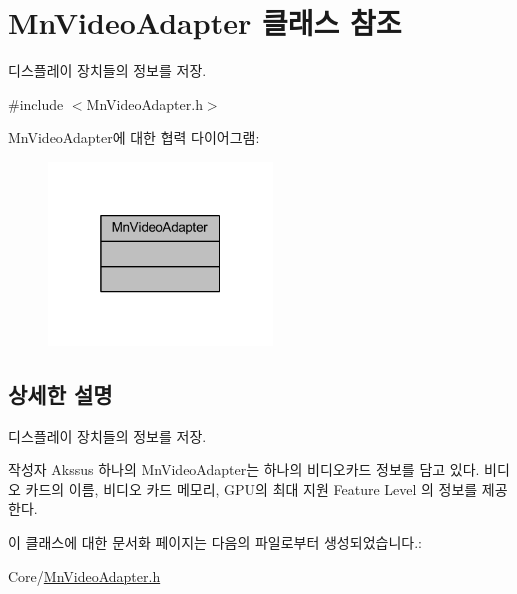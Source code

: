 \hypertarget{class_mn_video_adapter}{}\section{Mn\+Video\+Adapter 클래스 참조}
\label{class_mn_video_adapter}


디스플레이 장치들의 정보를 저장.  




{\ttfamily \#include $<$Mn\+Video\+Adapter.\+h$>$}



Mn\+Video\+Adapter에 대한 협력 다이어그램\+:
\nopagebreak
\begin{figure}[H]
\begin{center}
\leavevmode
\includegraphics[width=169pt]{class_mn_video_adapter__coll__graph}
\end{center}
\end{figure}


\subsection{상세한 설명}
디스플레이 장치들의 정보를 저장. 

\begin{DoxyAuthor}{작성자}
Akssus 하나의 Mn\+Video\+Adapter는 하나의 비디오카드 정보를 담고 있다. 비디오 카드의 이름, 비디오 카드 메모리, G\+P\+U의 최대 지원 Feature Level 의 정보를 제공한다. 
\end{DoxyAuthor}


이 클래스에 대한 문서화 페이지는 다음의 파일로부터 생성되었습니다.\+:\begin{DoxyCompactItemize}
\item 
Core/\hyperlink{_mn_video_adapter_8h}{Mn\+Video\+Adapter.\+h}\end{DoxyCompactItemize}
